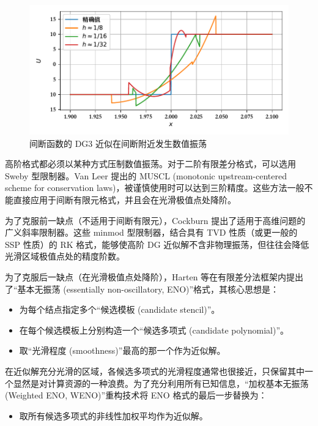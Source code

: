 \begin{figure}[h!]
\begin{centering}
\includegraphics[width=1\textwidth]{figures/linear_scalar/gibbs}
\par\end{centering}
\caption{\label{fig:Gibbs}间断函数的 DG3 近似在间断附近发生数值振荡}
\end{figure}

高阶格式都必须以某种方式压制数值振荡。对于二阶有限差分格式，可以选用 Sweby 型限制器。Van
Leer
提出的 MUSCL (monotonic upstream-centered scheme for conservation laws)，被谨慎使用时可以达到三阶精度。这些方法一般不能直接应用于间断有限元格式，并且会在光滑极值点处降阶。

为了克服前一缺点（不适用于间断有限元），Cockburn 提出了适用于高维问题的广义斜率限制器。这些
minmod 型限制器，结合具有 TVD 性质（或更一般的 SSP 性质）的 RK 格式，能够使高阶 DG 近似解不含非物理振荡，但往往会降低光滑区域极值点处的精度阶数。

为了克服后一缺点（在光滑极值点处降阶），Harten 等在有限差分法框架内提出了“基本无振荡
(essentially non-oscillatory, ENO)”格式，其核心思想是：
\begin{itemize}
\item 为每个结点指定多个“候选模板 (candidate stencil)”。
\item 在每个候选模板上分别构造一个“候选多项式 (candidate polynomial)”。
\item 取“光滑程度 (smoothness)”最高的那一个作为近似解。
\end{itemize}

在近似解充分光滑的区域，各候选多项式的光滑程度通常也很接近，只保留其中一个显然是对计算资源的一种浪费。为了充分利用所有已知信息，“加权基本无振荡
(Weighted ENO, WENO)”重构技术将
ENO 格式的最后一步替换为：
\begin{itemize}
\item 取所有候选多项式的非线性加权平均作为近似解。
\end{itemize}


